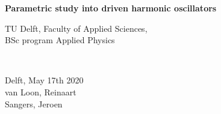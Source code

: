 \begin{titlepage}

\newcommand{\HRule}{\rule{\linewidth}{0.5mm}} %

\center


{ \huge \bfseries Parametric study into driven harmonic oscillators }\\[1cm] %






\vfill
\begin{minipage}{0.4\textwidth}
    \begin{flushleft}
        TU Delft, Faculty of Applied Sciences,\\
        BSc program Applied Physics
    \end{flushleft}
\end{minipage}
~
\begin{minipage}{0.4\textwidth}
    \begin{flushright}
        Delft, May 17th 2020\\
        van Loon, Reinaart\\
        Sangers, Jeroen
    \end{flushright}
\end{minipage}\\[1.5cm]


\end{titlepage}
